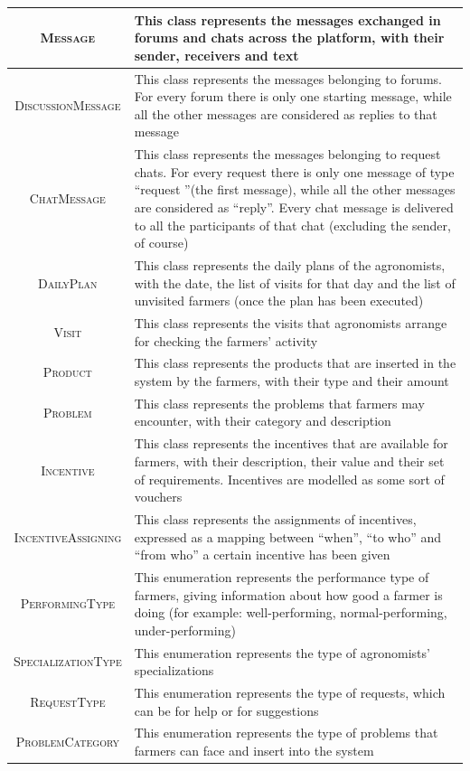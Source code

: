 \begin{center}
\begin{longtable}{|c|m{}|}
            \hline
            \textsc{Message}  &    This class represents the messages exchanged in forums and chats across the platform, with their sender, receivers and text  \\
            \hline
            \textsc{DiscussionMessage}  &    This class represents the messages belonging to forums. For every forum there is only one starting message, while all the other messages are considered as replies to that message  \\
            \hline
            \textsc{ChatMessage}  &    This class represents the messages belonging to request chats. For every request there is only one message of type “request ”(the first message), while all the other messages are considered as “reply”. Every chat message is delivered to all the participants of that chat (excluding the sender, of course)  \\
            \hline
            \textsc{DailyPlan}  &    This class represents the daily plans of the agronomists, with the date, the list of visits for that day and the list of unvisited farmers (once the plan has been executed)  \\
            \hline
            \textsc{Visit}  &    This class represents the visits that agronomists arrange for checking the farmers’ activity  \\
            \hline
            \textsc{Product}  &    This class represents the products that are inserted in the system by the farmers, with their type and their amount  \\
            \hline
            \textsc{Problem}  &    This class represents the problems that farmers may encounter, with their category and description  \\
            \hline
            \textsc{Incentive}  &    This class represents the incentives that are available for farmers, with their description, their value and their set of requirements. Incentives are modelled as some sort of vouchers  \\
            \hline
            \textsc{IncentiveAssigning}  &    This class represents the assignments of incentives, expressed as a mapping between “when”, “to who” and “from who” a certain incentive has been given  \\
            \hline
            \hline
            \textsc{PerformingType}  &    This enumeration represents the performance type of farmers, giving information about how good a farmer is doing (for example: well-performing, normal-performing, under-performing)  \\
            \hline
            \textsc{SpecializationType}  &    This enumeration represents the type of agronomists’ specializations \\
            \hline
            \textsc{RequestType}  &    This enumeration represents the type of requests, which can be for help or for suggestions  \\
            \hline
            \textsc{ProblemCategory}  &    This enumeration represents the type of problems that farmers can face and insert into the system  \\
            \hline
        

\end{longtable}
\end{center}
